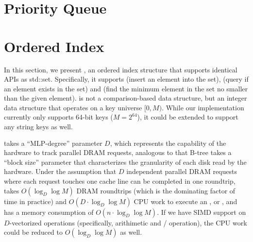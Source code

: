 \documentclass[11pt, usletter]{article}
\begin{document}
\section{Priority Queue} \label{priorityqueue}

\section{Ordered Index} \label{orderedindex}

In this section, we present \MlpIndex, an ordered index structure that supports identical APIs as std::set.
Specifically, it supports \insertion (insert an element into the set), \lookup (query if an element exists in the set) 
and \lowerbound (find the minimum element in the set no smaller than the given element).
\MlpIndex is not a comparison-based data structure, but an integer data structure that operates on a key universe $[0,M)$.
While our implementation currently only supports 64-bit keys ($M=2^{64}$), it could be extended to support any string keys as well.

\MlpIndex takes a ``MLP-degree'' parameter $D$, 
which represents the capability of the hardware to track parallel DRAM requests, 
analogous to that B-tree takes a ``block size'' parameter that characterizes the granularity of each disk read by the hardware.
Under the assumption that $D$ independent parallel DRAM requests where each request touches one cache line can be completed in one roundtrip,
\MlpIndex takes $O(\log_D\log M)$ DRAM roundtrips (which is the dominating factor of time in practice) 
and $O(D\cdot\log_D\log M)$ CPU work to execute an \insertion, \lookup or \lowerbound,
and has a memory consumption of $O(n\cdot \log_D\log M)$.
If we have SIMD support on $D$-vectorized operations (specifically, arithimetic and \simdgather/ \simdscatter operation), 
the CPU work could be reduced to $O(\log_D\log M)$ as well.
\end{document}
